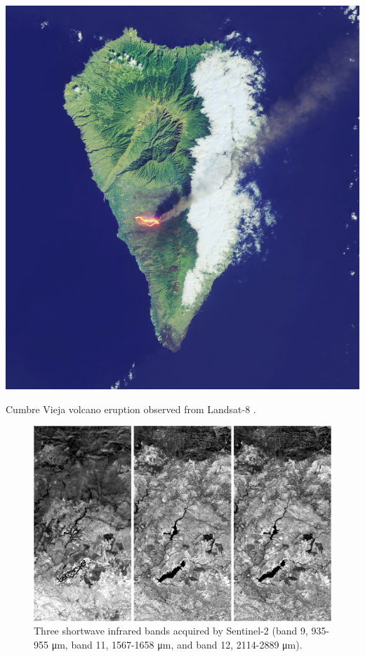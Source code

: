 \begin{marginfigure}[-1.5cm]
	\includegraphics{figs/introduction/landsat8_lapalma.jpg}
	\caption{Cumbre Vieja volcano eruption observed from Landsat-8 \cite{nasa_earth_observatory_lava_2021}.}
	\label{fig:la_palma_landsat8}
\end{marginfigure}

\begin{figure}[!ht]
	\includegraphics{figs/introduction/sentinel2_bands.png}
	\caption{Three shortwave infrared bands acquired by Sentinel-2 (band 9, 935-955 \si{\micro\meter}, band 11, 1567-1658 \si{\micro\meter}, and band 12, 2114-2889 \si{\micro\meter}). }
    \label{fig:sentinel2}
\end{figure}


